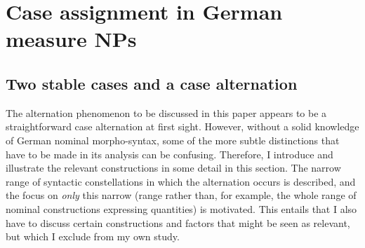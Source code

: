 \documentclass[USenglish]{article}
\begin{document}
%
%
%








\section{Case assignment in German measure NPs}
\label{sec:germanmeasurenps}


\subsection{Two stable cases and a case alternation}
\label{sec:descriptive}

The alternation phenomenon to be discussed in this paper appears to be a straightforward case alternation at first sight.
However, without a solid knowledge of German nominal morpho-syntax, some of the more subtle distinctions that have to be made in its analysis can be confusing.
Therefore, I introduce and illustrate the relevant constructions in some detail in this section.
The narrow range of syntactic constellations in which the alternation occurs is described, and the focus on \textit{only} this narrow (range rather than, for example, the whole range of nominal constructions expressing quantities) is motivated.
This entails that I also have to discuss certain constructions and factors that might be seen as relevant, but which I exclude from my own study.
\end{document}
